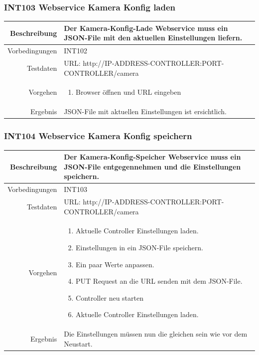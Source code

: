 \subsubsection{INT103 Webservice Kamera Konfig laden}
\begin{table}[h!]
	\renewcommand{\arraystretch}{1.5}
	\begin{tabular}{|r|p{14cm}|}
		\hline Beschreibung & Der Kamera-Konfig-Lade Webservice muss ein JSON-File mit den aktuellen Einstellungen liefern. \\ 
		\hline Vorbedingungen & INT102 \\ 
		\hline Testdaten & URL: http://IP-ADDRESS-CONTROLLER:PORT-CONTROLLER/camera \\ 
		\hline Vorgehen & 
		\begin{enumerate}
			\item Browser öffnen und URL eingeben
		\end{enumerate} \\ 
		\hline Ergebnis & JSON-File mit aktuellen Einstellungen ist ersichtlich. \\ 
		\hline 
	\end{tabular}
\end{table}

\subsubsection{INT104 Webservice Kamera Konfig speichern}
\begin{table}[h!]
	\renewcommand{\arraystretch}{1.5}
	\begin{tabular}{|r|p{14cm}|}
		\hline Beschreibung & Der Kamera-Konfig-Speicher Webservice muss ein JSON-File entgegennehmen und die Einstellungen speichern. \\ 
		\hline Vorbedingungen & INT103 \\ 
		\hline Testdaten & URL: http://IP-ADDRESS-CONTROLLER:PORT-CONTROLLER/camera \\ 
		\hline Vorgehen & 
		\begin{enumerate}
			\item Aktuelle Controller Einstellungen laden.
			\item Einstellungen in ein JSON-File speichern.
			\item Ein paar Werte anpassen.
			\item PUT Request an die URL senden mit dem JSON-File.
			\item Controller neu starten
			\item Aktuelle Controller Einstellungen laden.
		\end{enumerate} \\ 
		\hline Ergebnis & Die Einstellungen müssen nun die gleichen sein wie vor dem Neustart. \\ 
		\hline 
	\end{tabular}
\end{table}


